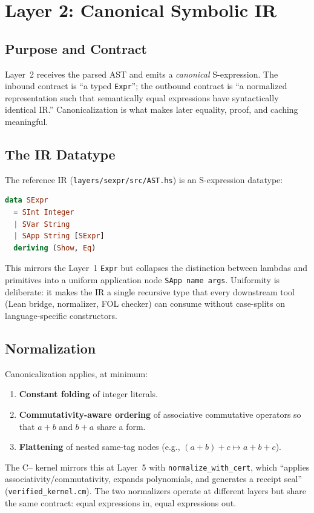 \chapter{Layer 2: Canonical Symbolic IR}
\label{ch:ir}

\section{Purpose and Contract}
\label{sec:ir-purpose}

Layer~2 receives the parsed AST and emits a \emph{canonical} S-expression. The
inbound contract is ``a typed \texttt{Expr}''; the outbound contract is ``a
normalized representation such that semantically equal expressions have
syntactically identical IR.'' Canonicalization is what makes later
equality, proof, and caching meaningful.

\section{The IR Datatype}
\label{sec:ir-ast}

The reference IR (\texttt{layers/sexpr/src/AST.hs}) is an S-expression
datatype:
\begin{lstlisting}[language=Haskell,caption={S-expression AST (AST.hs).},label=lst:ir-ast]
data SExpr
  = SInt Integer
  | SVar String
  | SApp String [SExpr]
  deriving (Show, Eq)
\end{lstlisting}
This mirrors the Layer~1 \texttt{Expr} but collapses the distinction between
lambdas and primitives into a uniform application node \texttt{SApp name
args}. Uniformity is deliberate: it makes the IR a single recursive type that
every downstream tool (Lean bridge, normalizer, FOL checker) can consume
without case-splits on language-specific constructors.

\section{Normalization}
\label{sec:ir-norm}

Canonicalization applies, at minimum:
\begin{enumerate}
  \item \textbf{Constant folding} of integer literals.
  \item \textbf{Commutativity-aware ordering} of associative commutative
        operators so that $a+b$ and $b+a$ share a form.
  \item \textbf{Flattening} of nested same-tag nodes (e.g., $(a+b)+c
        \mapsto a+b+c$).
\end{enumerate}
The C{--} kernel mirrors this at Layer~5 with \texttt{normalize\_with\_cert},
which ``applies associativity/commutativity, expands polynomials, and
generates a receipt seal'' (\texttt{verified\_kernel.cm}). The two
normalizers operate at different layers but share the same contract: equal
expressions in, equal expressions out.

